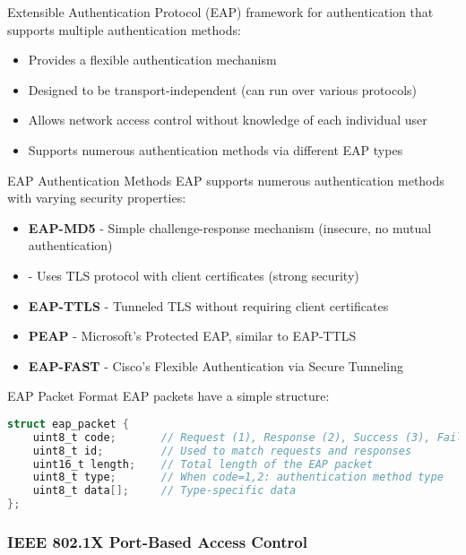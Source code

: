 \begin{definition}{Extensible Authentication Protocol (EAP)}
framework for authentication that supports multiple authentication methods:
\begin{itemize}
    \item Provides a flexible authentication mechanism
    \item Designed to be transport-independent (can run over various protocols)
    \item Allows network access control without knowledge of each individual user
    \item Supports numerous authentication methods via different EAP types
\end{itemize}
\end{definition}

\begin{concept}{EAP Authentication Methods}
EAP supports numerous authentication methods with varying security properties:
\begin{itemize}
    \item \textbf{EAP-MD5} - Simple challenge-response mechanism (insecure, no mutual authentication)
    \item {} - Uses TLS protocol with client certificates (strong security)
    \item \textbf{EAP-TTLS} - Tunneled TLS without requiring client certificates
    \item \textbf{PEAP} - Microsoft's Protected EAP, similar to EAP-TTLS
    \item \textbf{EAP-FAST} - Cisco's Flexible Authentication via Secure Tunneling
\end{itemize}
\end{concept}

\begin{code}{EAP Packet Format}
EAP packets have a simple structure:
\begin{lstlisting}[language=C, style=basesmolll]
struct eap_packet {
    uint8_t code;       // Request (1), Response (2), Success (3), Failure (4)
    uint8_t id;         // Used to match requests and responses
    uint16_t length;    // Total length of the EAP packet
    uint8_t type;       // When code=1,2: authentication method type
    uint8_t data[];     // Type-specific data
};
\end{lstlisting}
\end{code}


\subsubsection{IEEE 802.1X Port-Based Access Control}



